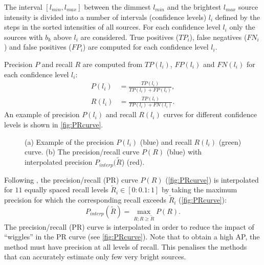 The interval $[l_{min},l_{max}]$ between the dimmest $l_{min}$ and the brightest $l_{max}$ source intensity is divided into a number of intervals (confidence levels) $l_i$ defined by the steps in the sorted intensities of all sources. For each confidence level $l_i$ only the sources with $b_k$ above $l_i$ are considered. True positives ($\unit{TP}_i$), false negatives ($\unit{FN}_i$) and false positives ($\unit{FP}_i$) are computed for each confidence level $l_i$.

Precision $P$ and recall $R$ are computed from $\unit{TP}(l_i)$, $\unit{FP}(l_i)$ and $\unit{FN}(l_i)$ for each confidence level $l_i$:
%
\begin{align} \label{eq:TP,FN} 
	P(l_i)& = \frac{\unit{TP}(l_i)}{\unit{TP}(l_i)+\unit{FP}(l_i)},\\
	R(l_i)& = \frac{\unit{TP}(l_i)}{\unit{TP}(l_i)+\unit{FN}(l_i)}.
\end{align}
%
An example of precision $P(l_i)$ and recall $R(l_i)$ curves for different confidence levels is shown in \autoref{fig:PRcurve}\aaa. 
%
\begin{figure}[!h]
	\newcommand{\widthfig}{.5\textwidth}
	\newcommand{\sizefig}{.4}
	\centering
	\caption{(a) Example of the precision $P(l_i)$ (blue) and recall $R(l_i)$ (green) curve. (b) The precision/recall curve $P(R)$ (blue) with interpolated precision $P_{interp}(\tilde{R}$) (red).}
	\label{fig:PRcurve}
\end{figure}

Following \cite{Everingham2009}, the precision/recall (PR) curve $P(R)$ (\autoref{fig:PRcurve}\aaa) is interpolated for $11$ equally spaced recall levels $\tilde{R}_i\in[0:0.1:1]$ by taking the maximum precision for which the corresponding recall exceeds $\tilde{R}_i$ (\autoref{fig:PRcurve}\bbb):
%
\begin{equation}
	P_{interp}(\tilde{R})=\max_{R;R\geq \tilde{R}}P(R).
\end{equation}
%
The precision/recall (PR) curve is interpolated in order to reduce the impact of ``wiggles'' in the PR curve (see \autoref{fig:PRcurve}\bbb). Note that to obtain a high AP, the method must have precision at all levels of recall. This penalises the methods that can accurately estimate only few very bright sources. 

